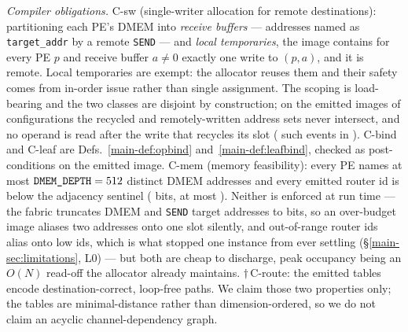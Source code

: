 \documentclass[journal,10pt]{IEEEtran}
\theoremstyle{plain}
\theoremstyle{definition}
\theoremstyle{remark}
\newcommand{\sv}[1]{\texttt{#1}}
\begin{document}
\emph{Compiler obligations.}
\textsf{C-sw} (single-writer allocation for remote destinations): partitioning
each PE's DMEM into \emph{receive buffers} --- addresses named as
\texttt{target\_addr} by a remote \texttt{SEND} --- and \emph{local
temporaries}, the image contains for every PE $p$ and receive buffer
$a \neq 0$ exactly one write to $(p,a)$, and it is remote. Local temporaries
are exempt: the allocator reuses them and their safety comes from in-order
issue rather than single assignment. The scoping is load-bearing and the two
classes are disjoint by construction; on the emitted images of
\RecycleConfigs{} configurations the recycled and remotely-written address
sets never intersect, and no operand is read after the write that recycles its
slot (\RecycleUnsafe{} such events in \RecycleEvents{}).
\textsf{C-bind} and \textsf{C-leaf} are Defs.~\ref{main-def:opbind}
and~\ref{main-def:leafbind}, checked as post-conditions on the emitted image.
\textsf{C-mem} (memory feasibility): every PE names at most
$\sv{DMEM\_DEPTH} = \DmemDepth$ distinct DMEM addresses and every emitted
router id is below the adjacency sentinel (\RouterIdBits{} bits, at most
\RouterIdMax). Neither is enforced at run time --- the fabric truncates DMEM
and \texttt{SEND} target addresses to \SendAddrBits{} bits, so an over-budget
image aliases two addresses onto one slot silently, and out-of-range router
ids alias onto low ids, which is what stopped one instance from ever settling
(\S\ref{main-sec:limitations}, L0) --- but both are cheap to discharge, peak
occupancy being an $O(N)$ read-off the allocator already maintains.
$\dagger$\,\textsf{C-route}: the emitted tables encode destination-correct,
loop-free paths. We claim those two properties only; the tables are
minimal-distance rather than dimension-ordered, so we do not claim an acyclic
channel-dependency graph.
\end{document}
